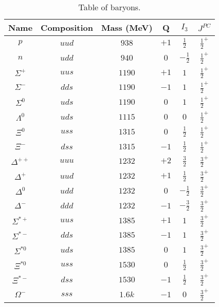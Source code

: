 \documentclass{article}
\begin{document}
\begin{table}[h!]
    \centering
    \begin{tabular}{||c c c c c c||} 
    \hline
    Name & Composition & Mass (MeV) & Q & $I_3$ & $J^{PC}$ \\ [0.5ex] 
    \hline\hline
    $p$ & $uud$ & $938$ & $+1$ & $\frac{1}{2}$ & $\frac{1}{2}^{+}$ \\[1ex]
    $n$ & $udd$ & $940$ & $0$ & $-\frac{1}{2}$ & $\frac{1}{2}^{+}$ \\[1ex]
    $\Sigma^+$ & $uus$ & $1190$ & $+1$ & $1$ & $\frac{1}{2}^{+}$ \\[1ex]
    $\Sigma^-$ & $dds$ & $1190$ & $-1$ & $1$ & $\frac{1}{2}^{+}$ \\[1ex]
    $\Sigma^0$ & $uds$ & $1190$ & $0$ & $1$ & $\frac{1}{2}^{+}$ \\[1ex]
    $\Lambda^0$ & $uds$ & $1115$ & $0$ & $0$ & $\frac{1}{2}^{+}$ \\[1ex]
    $\Xi^0$ & $uss$ & $1315$ & $0$ & $\frac{1}{2}$ & $\frac{1}{2}^{+}$ \\[1ex]
    $\Xi^-$ & $dss$ & $1315$ & $-1$ & $\frac{1}{2}$ & $\frac{1}{2}^{+}$ \\[1ex]
    $\Delta^{++}$ & $uuu$ & $1232$ & $+2$ & $\frac{3}{2}$ & $\frac{3}{2}^{+}$ \\[1ex]
    $\Delta^+$ & $uud$ & $1232$ & $+1$ & $\frac{1}{2}$ & $\frac{3}{2}^{+}$ \\[1ex]
    $\Delta^0$ & $udd$ & $1232$ & $0$ & $-\frac{1}{2}$ & $\frac{3}{2}^{+}$ \\[1ex]
    $\Delta^-$ & $ddd$ & $1232$ & $-1$ & $-\frac{3}{2}$ & $\frac{3}{2}^{+}$ \\[1ex]
    $\Sigma^{*+}$ & $uus$ & $1385$ & $+1$ & $1$ & $\frac{3}{2}^{+}$ \\[1ex]
    $\Sigma^{*-}$ & $dds$ & $1385$ & $-1$ & $1$ & $\frac{3}{2}^{+}$ \\[1ex]
    $\Sigma^{*0}$ & $uds$ & $1385$ & $0$ & $1$ & $\frac{3}{2}^{+}$ \\[1ex]
    $\Xi^{*0}$ & $uss$ & $1530$ & $0$ & $\frac{1}{2}$ & $\frac{3}{2}^{+}$ \\[1ex]
    $\Xi^{*-}$ & $dss$ & $1530$ & $-1$ & $\frac{1}{2}$ & $\frac{3}{2}^{+}$ \\[1ex]
    $\Omega^-$ & $sss$ & $1.6k$ & $-1$ & $0$ & $\frac{3}{2}^{+}$ \\[1ex]
    \hline
    \end{tabular}
    \caption{Table of baryons.}
    \label{table:baryons}
\end{table}
\end{document}
